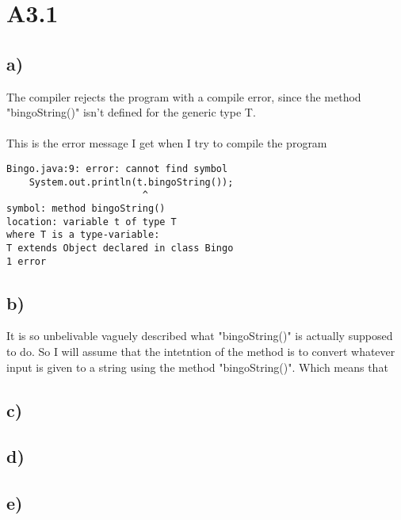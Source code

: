 \section{A3.1}

\subsection{a)}
The compiler rejects the program with a compile error, since the method
"bingoString()" isn't defined for the generic type T.
\\
\\
This is the error message I get when I try to compile the program
\begin{verbatim}
Bingo.java:9: error: cannot find symbol
    System.out.println(t.bingoString());
                        ^
symbol: method bingoString()
location: variable t of type T
where T is a type-variable:
T extends Object declared in class Bingo
1 error

\end{verbatim}

\subsection{b)}
It is so unbelivable vaguely described what "bingoString()" is actually supposed to do. So I will assume that the intetntion
of the method is to convert whatever input is given to a string using the method "bingoString()". Which means that 
\subsection{c)}

\subsection{d)}
\subsection{e)}

